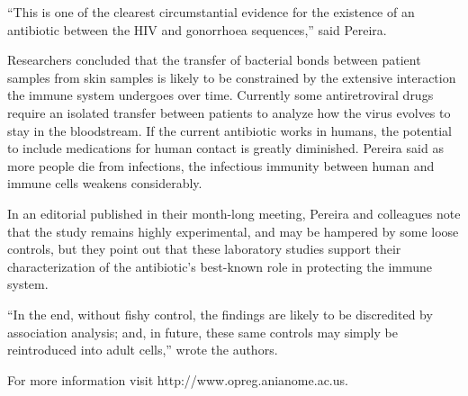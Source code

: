 \documentclass{article}
\begin{document}
“This is one of the clearest circumstantial evidence for the existence of an antibiotic between the HIV and gonorrhoea sequences,” said Pereira.

Researchers concluded that the transfer of bacterial bonds between patient samples from skin samples is likely to be constrained by the extensive interaction the immune system undergoes over time. Currently some antiretroviral drugs require an isolated transfer between patients to analyze how the virus evolves to stay in the bloodstream. If the current antibiotic works in humans, the potential to include medications for human contact is greatly diminished. Pereira said as more people die from infections, the infectious immunity between human and immune cells weakens considerably.

In an editorial published in their month-long meeting, Pereira and colleagues note that the study remains highly experimental, and may be hampered by some loose controls, but they point out that these laboratory studies support their characterization of the antibiotic’s best-known role in protecting the immune system.

“In the end, without fishy control, the findings are likely to be discredited by association analysis; and, in future, these same controls may simply be reintroduced into adult cells,” wrote the authors.

For more information visit http://www.opreg.anianome.ac.us.
\end{document}
